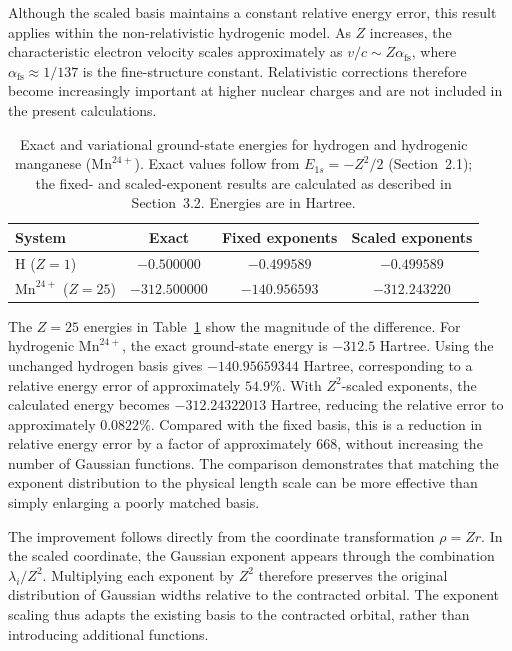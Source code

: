 Although the scaled basis maintains a constant
relative energy error, this result applies within
the non-relativistic hydrogenic model. As $Z$
increases, the characteristic electron velocity
scales approximately as $v/c\sim Z\alpha_{\mathrm{fs}}$,
where $\alpha_{\mathrm{fs}}\approx1/137$ is the
fine-structure constant. Relativistic corrections
therefore become increasingly important at higher
nuclear charges and are not included in the
present calculations.


\begin{table}[htbp]
\centering
\caption{Exact and variational ground-state energies for
hydrogen and hydrogenic manganese ($\mathrm{Mn}^{24+}$).
Exact values follow from $E_{1s}=-Z^2/2$ (Section~2.1);
the fixed- and scaled-exponent results are calculated
as described in Section~3.2. Energies are in Hartree.}
\label{tab:charge_energies}
\begin{tabular}{lccc}
\hline
System & Exact & Fixed exponents & Scaled exponents \\
\hline
H ($Z=1$)
    & $-0.500000$
    & $-0.499589$
    & $-0.499589$ \\
$\mathrm{Mn}^{24+}$ ($Z=25$)
    & $-312.500000$
    & $-140.956593$
    & $-312.243220$ \\
\hline
\end{tabular}
\end{table}

The $Z=25$ energies in Table~\ref{tab:charge_energies} show the magnitude of the difference.
For hydrogenic $\mathrm{Mn}^{24+}$, the exact ground-state energy is $-312.5$ Hartree. Using the unchanged hydrogen basis gives $-140.95659344$ Hartree, corresponding to a relative energy error of approximately $54.9\%$.
With $Z^2$-scaled exponents, the calculated energy becomes $-312.24322013$ Hartree, reducing the
relative error to approximately $0.0822\%$. Compared with the fixed basis, this is a reduction
in relative energy error by a factor of approximately 668, without increasing the number of
Gaussian functions. The comparison demonstrates that matching the exponent distribution to the
physical length scale can be more effective than simply enlarging a poorly matched basis.

The improvement follows directly from the coordinate transformation $\rho=Zr$. In the scaled coordinate, the Gaussian exponent appears through the combination $\lambda_i/Z^2$. Multiplying each exponent by $Z^2$ therefore preserves the original distribution of Gaussian widths relative to the contracted orbital.
The exponent scaling thus adapts the existing basis to the contracted orbital, rather than introducing additional functions.


